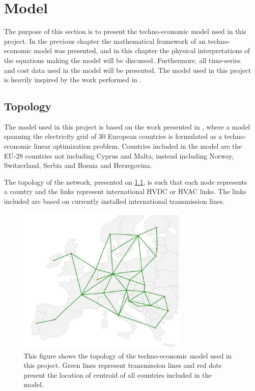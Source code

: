 
\chapter{Model}\label{chap:model}

The purpose of this section is to present the techno-economic model used in this project. In the previous chapter the mathematical framework of an techno-economic model was presented, and in this chapter the physical interpretations of the equations making the model will be discussed. Furthermore, all time-series and cost data used in the model will be presented. The model used in this project is heavily inspired by the work performed in \cite{PyPSA_euro_30_model}. 

\section{Topology}
The model used in  this project is based on the work presented in \cite{PyPSA_euro_30_model}, where a model spanning the electricity grid of 30 European countries is formulated as a techno-economic linear optimization problem. Countries included in the model are the EU-28 countries not including Cyprus and Malta, instead including Norway, Switzerland, Serbia and Bosnia and Herzegovina.

The topology of the network, presented on \ref{fig:network_lay}, is such that each node represents a country and the links represent international HVDC or HVAC links. The links included are based on currently installed international transmission lines. 


\begin{figure}[h]\centering
	\includegraphics[width=0.75\textwidth]{./Images/network_layout}
	\caption{This figure shows the topology of the techno-economic model used in this project. Green lines represent transmission lines and red dots present the location of centroid of all countries included in the model.}
	\label{fig:network_lay}
\end{figure}


